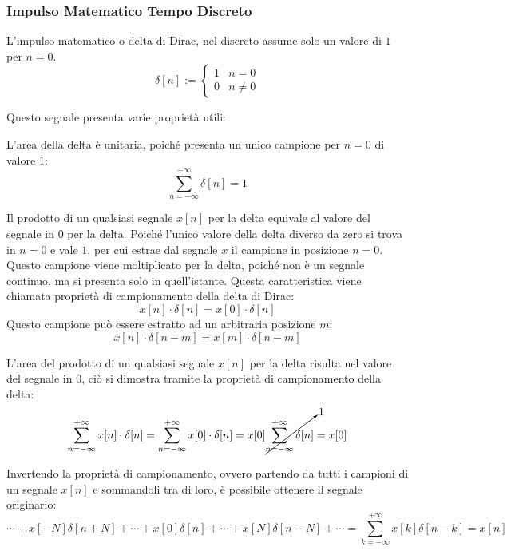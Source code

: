 \documentclass{article}
\numberwithin{equation}{subsection}
\begin{document}
\subsubsection{Impulso Matematico Tempo Discreto}

L'impulso matematico o delta di Dirac, nel discreto assume solo un valore di $1$ per $n=0$. 
\begin{equation}
    \delta[n]:=\begin{cases}
        1&n=0\\
        0&n\neq0
    \end{cases}
\end{equation}

Questo segnale presenta varie proprietà utili:


L'area della delta è unitaria, poiché presenta un unico campione per $n=0$ di valore $1$:
\begin{equation*}
    \displaystyle\sum_{n=-\infty}^{+\infty}\delta[n]=1
\end{equation*}



Il prodotto di un qualsiasi segnale $x[n]$ per la delta equivale al valore del segnale in $0$ per la delta. Poiché l'unico valore della delta diverso da zero si trova in $n=0$ 
e vale $1$, per cui estrae dal segnale $x$ il campione in posizione $n=0$. Questo campione viene moltiplicato per la delta, poiché non è un segnale continuo, ma si presenta 
solo in quell'istante. Questa caratteristica viene chiamata proprietà di campionamento 
della delta di Dirac:
\begin{equation*}
    x[n]\cdot\delta[n]=x[0]\cdot\delta[n]
\end{equation*}
Questo campione può essere estratto ad un arbitraria posizione $m$:
\begin{equation*}
    x[n]\cdot\delta[n-m]=x[m]\cdot\delta[n-m]
\end{equation*}


L'area del prodotto di un qualsiasi segnale $x[n]$ per la delta risulta nel valore del segnale in $0$, ciò si dimostra tramite la proprietà di campionamento della delta:
\begin{equation*}
    \displaystyle\sum_{n=-\infty}^{+\infty} x[n]\cdot\delta[n]=\sum_{n=-\infty}^{+\infty} x[0]\cdot\delta[n]=x[0]\cancelto{1}{\sum_{n=-\infty}^{+\infty}\delta[n]}=x[0]
\end{equation*}


Invertendo la proprietà di campionamento, ovvero partendo da tutti i campioni di un segnale $x[n]$ e sommandoli tra di loro, è possibile ottenere il segnale originario: 
\begin{equation*}
    \cdots+x[-N]\delta[n+N]+\cdots+x[0]\delta[n]+\cdots+x[N]\delta[n-N]+\cdots=\displaystyle\sum_{k=-\infty}^{+\infty} x[k]\delta[n-k]=x[n]
\end{equation*}
\end{document}
